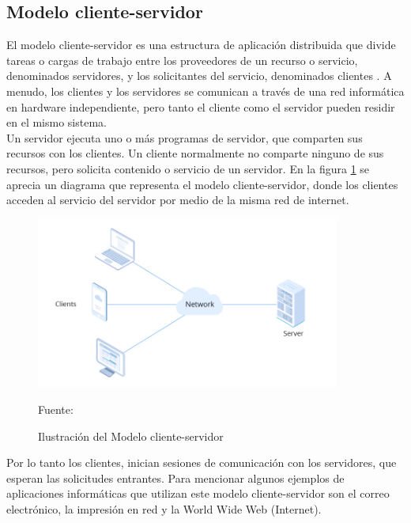 \subsection{Modelo cliente-servidor}
El modelo cliente-servidor es una estructura de aplicación distribuida que divide tareas o cargas de trabajo entre los proveedores de un recurso o servicio, denominados servidores, y los solicitantes del servicio, denominados clientes \cite{wikipedia:cliente_servidor}. A menudo, los clientes y los servidores se comunican a través de una red informática en hardware independiente, pero tanto el cliente como el servidor pueden residir en el mismo sistema.\\

Un servidor ejecuta uno o más programas de servidor, que comparten sus recursos con los clientes. Un cliente normalmente no comparte ninguno de sus recursos, pero solicita contenido o servicio de un servidor. En la figura \ref{fig:client_server} se aprecia un diagrama que representa el modelo cliente-servidor, donde los clientes acceden al servicio del servidor por medio de la misma red de internet.\\

\begin{figure}[H]
    \begin{center}
        \includegraphics[width=10cm]{img/capitulo_2/client-server.jpeg}
        \caption{Ilustración del Modelo cliente-servidor\\}
        Fuente: \cite{clientserver}
        \label{fig:client_server}
    \end{center}
\end{figure}

Por lo tanto los clientes, inician sesiones de comunicación con los servidores, que esperan las solicitudes entrantes. Para mencionar algunos ejemplos de aplicaciones informáticas que utilizan este modelo cliente-servidor son el correo electrónico, la impresión en red y la World Wide Web (Internet).\\

